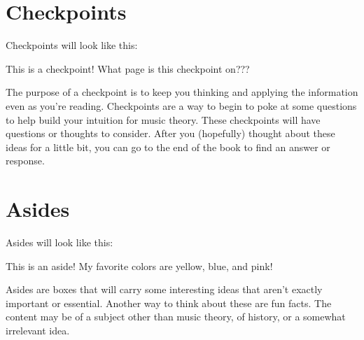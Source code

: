 \documentclass[../OpenAppliedMusicTheory.tex]{subfiles}
\begin{document}
    \section{Checkpoints}\label{ch0:checkpoints}
    Checkpoints will look like this:
    \begin{checkpoint}
        This is a checkpoint! What page is this checkpoint on???
    \end{checkpoint}
    The purpose of a checkpoint is to keep you thinking and applying the information even as you're reading. Checkpoints are a way to begin to poke at some questions to help build your intuition for music theory. These checkpoints will have questions or thoughts to consider. After you (hopefully) thought about these ideas for a little bit, you can go to the end of the book to find an answer or response.

    \section{Asides}\label{ch0:asides}
    Asides will look like this:
    \begin{aside}{This is an aside!}
        My favorite colors are yellow, blue, and pink!
    \end{aside}
    Asides are boxes that will carry some interesting ideas that aren't exactly important or essential. Another way to think about these are fun facts. The content may be of a subject other than music theory, of history, or a somewhat irrelevant idea.
\end{document}
